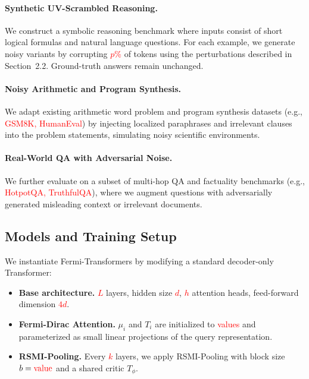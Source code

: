 \documentclass{article}
\newcommand{\TODO}[1]{\textcolor{red}{#1}}
\begin{document}
\paragraph{Synthetic UV-Scrambled Reasoning.}
We construct a symbolic reasoning benchmark where inputs consist of short logical formulas and natural language questions. For each example, we generate noisy variants by corrupting \TODO{$p$\%} of tokens using the perturbations described in Section~2.2. Ground-truth answers remain unchanged.

\paragraph{Noisy Arithmetic and Program Synthesis.}
We adapt existing arithmetic word problem and program synthesis datasets (e.g., \TODO{GSM8K, HumanEval}) by injecting localized paraphrases and irrelevant clauses into the problem statements, simulating noisy scientific environments.

\paragraph{Real-World QA with Adversarial Noise.}
We further evaluate on a subset of multi-hop QA and factuality benchmarks (e.g., \TODO{HotpotQA, TruthfulQA}), where we augment questions with adversarially generated misleading context or irrelevant documents.

\subsection{Models and Training Setup}

We instantiate Fermi-Transformers by modifying a standard decoder-only Transformer:

\begin{itemize}[leftmargin=*]
    \item \textbf{Base architecture.} \TODO{$L$} layers, hidden size \TODO{$d$}, \TODO{$h$} attention heads, feed-forward dimension \TODO{$4d$}.
    \item \textbf{Fermi-Dirac Attention.} $\mu_i$ and $T_i$ are initialized to \TODO{values} and parameterized as small linear projections of the query representation.
    \item \textbf{RSMI-Pooling.} Every \TODO{$k$} layers, we apply RSMI-Pooling with block size $b = \TODO{\text{value}}$ and a shared critic $T_\phi$.
\end{itemize}
\end{document}
